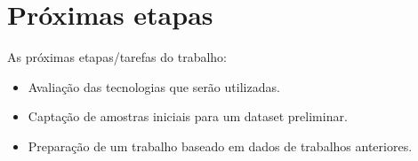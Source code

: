 \section{Próximas etapas}\label{next}
As próximas etapas/tarefas do trabalho:
\begin{itemize}
    \item Avaliação das tecnologias que serão utilizadas.
    \item Captação de amostras iniciais para um dataset preliminar.
    \item Preparação de um trabalho baseado em dados de trabalhos anteriores.
\end{itemize}
